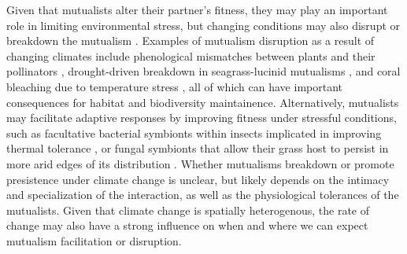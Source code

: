 \documentclass[11pt]{article}
\begin{document}
Given that mutualists alter their partner's fitness, they may play an important role in limiting environmental stress, but changing conditions may also disrupt or breakdown the mutualism \citep{aslan2013mutualism}. 
Examples of mutualism disruption as a result of changing climates include phenological mismatches between plants and their pollinators \citep{pauw2011reconstruction}, drought-driven breakdown in seagrass-lucinid mutualisms \citep{de2016drought}, and coral bleaching due to temperature stress \citep{sully2019global}, all of which can have important consequences for habitat and biodiversity maintainence. 
Alternatively, mutualists may facilitate adaptive responses by improving fitness under stressful conditions, such as facultative bacterial symbionts within insects implicated in improving thermal tolerance \citep{truitt2019wolbachia, renoz2019evolutionary}, or fungal symbionts that allow their grass host to persist in more arid edges of its distribution \citep{afkhami2014mutualist}. 
Whether mutualisms breakdown or promote presistence under climate change is unclear, but likely depends on the intimacy and specialization of the interaction, as well as the physiological tolerances of the mutualists\citep{toby2010mutualisms, warren2014mutualism, rafferty2015phenological}. 
Given that climate change is spatially heterogenous, the rate of change may also have a strong influence on when and where we can expect mutualism facilitation or disruption. 
\end{document}
